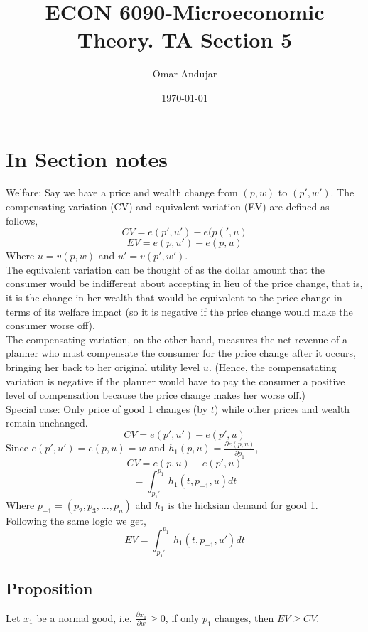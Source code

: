 \documentclass{article}
\title{ECON 6090-Microeconomic Theory. TA Section 5}
\author{Omar Andujar}
\date{\today}
\begin{document}
\raggedright
\pagestyle{fancy}
\fancyhf{}

\maketitle %

\section*{In Section notes}
Welfare:
Say we have a price and wealth change from $(p,w)$ to $(p',w')$. The compensating variation (CV) and equivalent variation (EV) are defined as follows,
\[CV = e(p',u') - e(p(',u)\]
\[EV = e(p,u') - e(p,u)\]
Where $u = v(p,w)$ and $u' = v(p',w')$.\\
The equivalent variation can be thought of as the dollar amount that the consumer would be indifferent about accepting in lieu of the price change, that is, it is the change in her wealth that would be equivalent to the price change in terms of its welfare impact (so it is negative if the price change would make the consumer worse off).\\
\bigskip
The compensating variation, on the other hand, measures the net revenue of a planner who must compensate the consumer for the price change after it occurs, bringing her back to her original utility level $u$. (Hence, the compensatating variation is negative if the planner would have to pay the consumer a positive level of compensation because the price change makes her worse off.)\\
\bigskip
Special case: Only price of good 1 changes (by $t$) while other prices and wealth remain unchanged.
\[CV = e(p',u') - e(p',u)\]
Since $e(p',u')=e(p,u)=w$ and $h_1(p,u) = \frac{\partial e(p,u)}{\partial p_1}$,
\[CV=e(p,u) - e(p',u)\]
\[=\int_{p_1'}^{p_1} h_1(t,p_{-1},u) dt\]
Where $p_{-1} = (p_2,p_3,...,p_n)$ ahd $h_1$ is the hicksian demand for good 1.\\
Following the same logic we get,
\[EV = \int_{p_1'}^{p_1} h_1(t,p_{-1},u') dt\]
\subsection*{Proposition}
Let $x_1$ be a normal good, i.e. $\frac{\partial x_1}{\partial w} \geq 0$, if only $p_1$ changes, then $EV \geq CV$.\\
\end{document}
